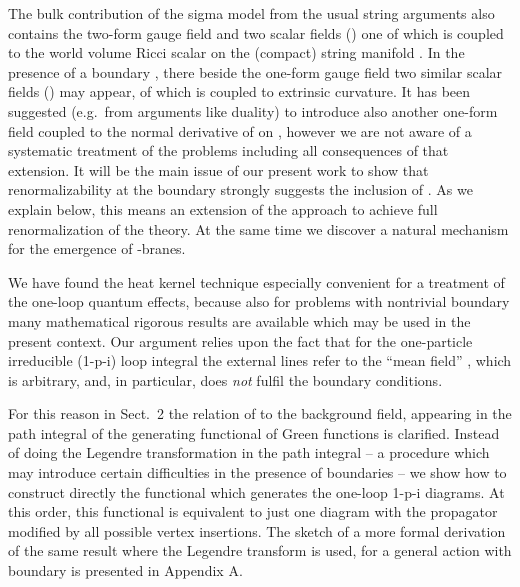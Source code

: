 \documentclass[a4paper,12pt]{article}
\begin{document}
The bulk contribution of the sigma 
model from the usual string arguments also contains the 
two-form gauge field \coordHE{} and two scalar fields (\coordHE{}) one 
of which \myHighlight{$(\Phi)$}\coordHE{} is coupled to the world volume
Ricci scalar on the 
(compact) string manifold \coordHE{}. In the presence of a 
boundary \coordHE{}, there beside the one-form gauge field 
\coordHE{} two similar scalar fields (\coordHE{}) may 
appear, of which \myHighlight{$\hat \Phi$}\coordHE{} is coupled to extrinsic 
curvature. It has been suggested 
\cite{dornotto86,DLP89,Leigh89,behrndtdorn92,dornotto96}
(e.g.\ from arguments like 
duality) to introduce also  another one-form field \coordHE{} 
coupled to the normal derivative of \coordHE{} on
 \coordHE{}, however we are not aware 
of a systematic treatment of the problems including all 
consequences of that extension. It will be the main issue of 
our present work to show that renormalizability at the 
boundary strongly suggests the inclusion of \coordHE{}. As we explain below,
this means an extension of the approach \cite{Callan88}
to achieve full renormalization of the theory. 
At the same time we discover a natural mechanism for the
emergence of \coordHE{}-branes.

We have found the heat kernel technique \cite{Gilkey} especially 
convenient for a treatment of the one-loop quantum effects, 
because also for  problems with nontrivial boundary many 
mathematical rigorous results are available which may be 
used in the present context. Our argument 
relies upon the fact that for the one-particle irreducible
(1-p-i) loop 
integral the external lines refer to the ``mean field'' 
\coordHE{}, which is arbitrary, and, in particular, does {\em 
not} fulfil the boundary conditions. 

For this reason in 
Sect.\ 2 the relation of \coordHE{} to the background field, 
appearing in the path integral of the generating functional 
of Green functions is clarified.  Instead of doing the 
Legendre transformation in the path integral -- a procedure
which may introduce certain difficulties in the presence
of boundaries -- we show how to construct directly the functional
which generates the one-loop 1-p-i 
diagrams. At this order, this functional is equivalent
to just one diagram with the propagator modified by all
possible vertex insertions. The sketch of a 
 more formal derivation of the same result where the Legendre
transform is used, for a general action with boundary 
is presented in Appendix A. 
\end{document}
